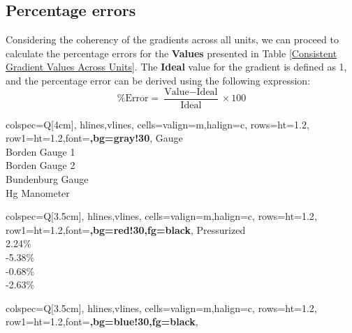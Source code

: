 \documentclass{article}
\begin{document}
	\subsection{Percentage errors}
	Considering the coherency of the gradients across all units, we can proceed to calculate the percentage errors for the \textbf{Values} presented in Table \ref{Consistent Gradient Values Across Units}. The \textbf{Ideal} value for the gradient is defined as 1, and the percentage error can be derived using the following expression:\\[0.7em]
	\begin{equation}
		\% \text{Error} = \frac{\text{Value} - \text{Ideal}}{\text{Ideal}} \times 100
	\end{equation}
\vspace{1em}
	\begin{center}	
		\hspace*{-1em}
	\begin{minipage}[t]{3cm}
		\centering
		\begin{tblr}{
				colspec={Q[4cm]},
				hlines,vlines,
				cells={valign=m,halign=c},
				rows={ht=1.2\baselineskip},
				row{1}={ht=1.2\baselineskip,font=\bfseries,bg=gray!30},
			}
			Gauge \\
			Borden Gauge 1 \\
			Borden Gauge 2 \\
			Bundenburg Gauge \\
			Hg Manometer \\
		\end{tblr}
	\end{minipage}
	\hspace{3.5em}
	\begin{minipage}[t]{3.5cm}
		\centering
		\begin{tblr}{
				colspec={Q[3.5cm]},
				hlines,vlines,
				cells={valign=m,halign=c},
				rows={ht=1.2\baselineskip},
				row{1}={ht=1.2\baselineskip,font=\bfseries,bg=red!30,fg=black},
			}
			Pressurized \\
			{2.24\%}\\
			{-5.38\%} \\
			{-0.68\%} \\
			{-2.63\%} \\
		\end{tblr}
	\end{minipage}
	\hspace{1em}
	\begin{minipage}[t]{3.5cm}
		\centering
		\begin{tblr}{
				colspec={Q[3.5cm]},
				hlines,vlines,
				cells={valign=m,halign=c},
				rows={ht=1.2\baselineskip},
				row{1}={ht=1.2\baselineskip,font=\bfseries,bg=blue!30,fg=black},
			}

\end{tblr}
\end{minipage}
\end{center}
\end{document}
